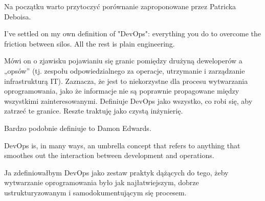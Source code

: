 \documentclass{article}
\begin{document}
Na początku warto przytoczyć porównanie zaproponowane przez Patricka Deboisa\cite{devOpsHandbook}.

\begin{displayquote}
    I've settled on my own definition of "DevOps": everything you do to overcome the friction between silos. All the rest is plain engineering.
\end{displayquote}

Mówi on o zjawisku pojawianiu się granic pomiędzy drużyną deweloperów a „opsów” (tj. zespołu odpowiedzialnego za operacje, utrzymanie i zarządzanie infrastrukturą IT). Zaznacza, że jest to niekorzystne dla procesu wytwarzania oprogramowania, jako że informacje nie są poprawnie propagowane między wszystkimi zainteresowanymi. Definiuje DevOps jako wszystko, co robi się, aby zatrzeć te granice. Reszte traktuję jako czystą inżynierię.
\newline

Bardzo podobnie definiuje to Damon Edwards\cite{damonEdwards}.

\begin{displayquote}
    DevOps is, in many ways, an umbrella concept that refers to anything that smoothes out the interaction between development and operations.
\end{displayquote}

Ja zdefiniowałbym DevOps jako zestaw praktyk dążących do tego, żeby wytwarzanie oprogramowania było jak najłatwiejszym, dobrze ustrukturyzowanym i samodokumentującym się procesem.
\end{document}
